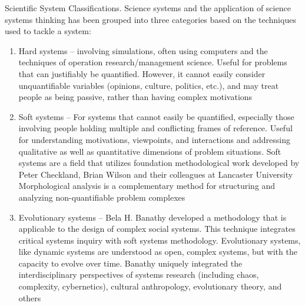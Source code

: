 Scientific System Classifications. Science systems and the application of science systems thinking has been grouped into three categories based on the techniques used to tackle a system:
\begin{enumerate}
	\item Hard systems – involving simulations, often using computers and the techniques of operation research/management science. Useful for problems that can justifiably be quantified. However, it cannot easily consider unquantifiable variables (opinions, culture, politics, etc.), and may treat people as being passive, rather than having complex motivations
	\item Soft systems – For systems that cannot easily be quantified, especially those involving people holding multiple and conflicting frames of reference. Useful for understanding motivations, viewpoints, and interactions and addressing qualitative as well as quantitative dimensions of problem situations. Soft systems are a field that utilizes foundation methodological work developed by Peter Checkland, Brian Wilson and their colleagues at Lancaster University Morphological analysis is a complementary method for structuring and analyzing non-quantifiable problem complexes
	\item Evolutionary systems – Bela H. Banathy developed a methodology that is applicable to the design of complex social systems. This technique integrates critical systems inquiry with soft systems methodology. Evolutionary systems, like dynamic systems are understood as open, complex systems, but with the capacity to evolve over time. Banathy uniquely integrated the interdisciplinary perspectives of systems research (including chaos, complexity, cybernetics), cultural anthropology, evolutionary theory, and others
\end{enumerate}

